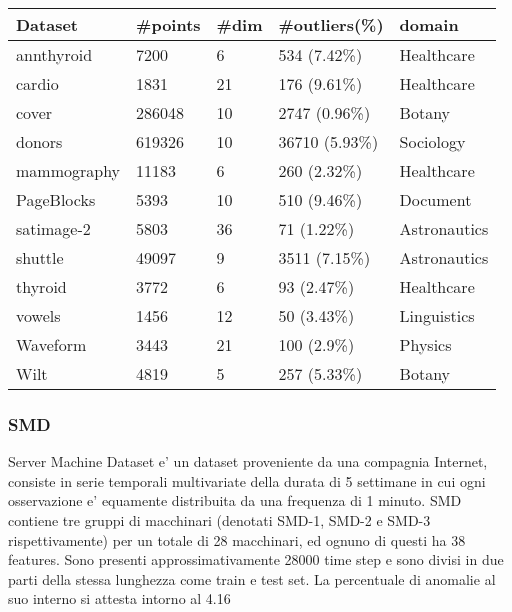 \begin{table}[]
\begin{tabular}{|l|l|l|l|l|}
\hline
\textbf{Dataset} & \textbf{\#points} & \textbf{\#dim} & \textbf{\#outliers(\%)} & \textbf{domain} \\ \hline
annthyroid       & 7200              & 6              & 534 (7.42\%)            & Healthcare      \\ \hline
cardio           & 1831              & 21             & 176 (9.61\%)            & Healthcare      \\ \hline
cover            & 286048            & 10             & 2747 (0.96\%)           & Botany          \\ \hline
donors           & 619326            & 10             & 36710 (5.93\%)          & Sociology       \\ \hline
mammography      & 11183             & 6              & 260 (2.32\%)            & Healthcare      \\ \hline
PageBlocks       & 5393              & 10             & 510 (9.46\%)            & Document        \\ \hline
satimage-2       & 5803              & 36             & 71 (1.22\%)             & Astronautics    \\ \hline
shuttle          & 49097             & 9              & 3511 (7.15\%)           & Astronautics    \\ \hline
thyroid          & 3772              & 6              & 93 (2.47\%)             & Healthcare      \\ \hline
vowels           & 1456              & 12             & 50 (3.43\%)             & Linguistics     \\ \hline
Waveform         & 3443              & 21             & 100 (2.9\%)             & Physics         \\ \hline
Wilt             & 4819              & 5              & 257 (5.33\%)            & Botany          \\ \hline
\end{tabular}
\end{table}

\subsubsection{SMD}
Server Machine Dataset e' un dataset proveniente da una compagnia Internet, consiste in serie temporali multivariate della durata di 5 settimane in cui ogni osservazione e' equamente distribuita da una frequenza di 1 minuto. SMD contiene tre gruppi di macchinari (denotati SMD-1, SMD-2 e SMD-3 rispettivamente) per un totale di 28 macchinari, ed ognuno di questi ha 38 features. Sono presenti approssimativamente 28000 time step e sono divisi in due parti della stessa lunghezza come train e test set. 
La percentuale di anomalie al suo interno si attesta intorno al 4.16%

